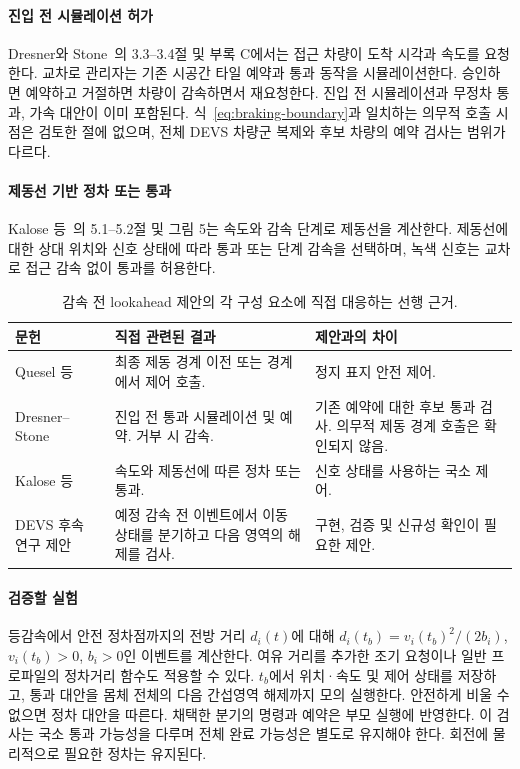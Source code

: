 \documentclass[11pt,a4paper]{article}
\theoremstyle{remark}
\begin{document}
\paragraph{진입 전 시뮬레이션 허가}
Dresner와 Stone~\cite{dresner2008}의 3.3--3.4절 및 부록 C에서는 접근 차량이 도착 시각과 속도를 요청한다. 교차로 관리자는 기존 시공간 타일 예약과 통과 동작을 시뮬레이션한다. 승인하면 예약하고 거절하면 차량이 감속하면서 재요청한다. 진입 전 시뮬레이션과 무정차 통과, 가속 대안이 이미 포함된다. 식~\eqref{eq:braking-boundary}과 일치하는 의무적 호출 시점은 검토한 절에 없으며, 전체 DEVS 차량군 복제와 후보 차량의 예약 검사는 범위가 다르다.

\paragraph{제동선 기반 정차 또는 통과}
Kalose 등~\cite{kalose2024}의 5.1--5.2절 및 그림 5는 속도와 감속 단계로 제동선을 계산한다. 제동선에 대한 상대 위치와 신호 상태에 따라 통과 또는 단계 감속을 선택하며, 녹색 신호는 교차로 접근 감속 없이 통과를 허용한다.
\begin{table}[htbp]
\centering\small
\caption{감속 전 lookahead 제안의 각 구성 요소에 직접 대응하는 선행 근거.}
\label{tab:prebraking-review}
\begin{tabular}{p{.24\linewidth}p{.33\linewidth}p{.34\linewidth}}
\toprule
문헌 & 직접 관련된 결과 & 제안과의 차이\\\midrule
Quesel 등~\cite{quesel2016} & 최종 제동 경계 이전 또는 경계에서 제어 호출. & 정지 표지 안전 제어.\\[4pt]
Dresner--Stone~\cite{dresner2008} & 진입 전 통과 시뮬레이션 및 예약. 거부 시 감속. & 기존 예약에 대한 후보 통과 검사. 의무적 제동 경계 호출은 확인되지 않음.\\[4pt]
Kalose 등~\cite{kalose2024} & 속도와 제동선에 따른 정차 또는 통과. & 신호 상태를 사용하는 국소 제어.\\[4pt]
DEVS 후속 연구 제안 & 예정 감속 전 이벤트에서 이동 상태를 분기하고 다음 영역의 해제를 검사. & 구현, 검증 및 신규성 확인이 필요한 제안.\\
\bottomrule
\end{tabular}
\end{table}

\paragraph{검증할 실험}
등감속에서 안전 정차점까지의 전방 거리 $d_i(t)$에 대해 $d_i(t_b)=v_i(t_b)^2/(2b_i)$, $v_i(t_b)>0$, $b_i>0$인 이벤트를 계산한다. 여유 거리를 추가한 조기 요청이나 일반 프로파일의 정차거리 함수도 적용할 수 있다. $t_b$에서 위치·속도 및 제어 상태를 저장하고, 통과 대안을 몸체 전체의 다음 간섭영역 해제까지 모의 실행한다. 안전하게 비울 수 없으면 정차 대안을 따른다. 채택한 분기의 명령과 예약은 부모 실행에 반영한다. 이 검사는 국소 통과 가능성을 다루며 전체 완료 가능성은 별도로 유지해야 한다. 회전에 물리적으로 필요한 정차는 유지된다.
\end{document}
